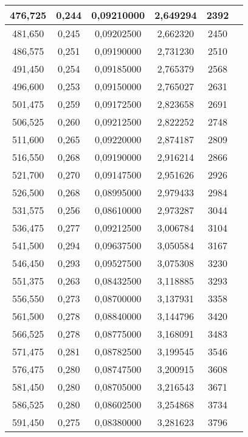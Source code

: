 \documentclass[a4paper,12pt]{article}
\numberwithin{equation}{section}
\begin{document}
\begin{appendices}
\begin{longtable}[c]{|c|c|c|c|c|c|}
476,725	&	 		0,244	&	 		0,09210000		 	&	2,649294	&	 		2392		\\\hline
481,650	&	 		0,245	&	 		0,09202500		 	&	2,662320	&	 		2450		\\\hline
486,575	&	 		0,251	&	 		0,09190000		 	&	2,731230	&	 		2510		\\\hline
491,450	&	 		0,254	&	 		0,09185000		 	&	2,765379	&	 		2568		\\\hline
496,600	&	 		0,253	&	 		0,09150000		 	&	2,765027	&	 		2631		\\\hline
501,475	&	 		0,259	&	 		0,09172500		 	&	2,823658	&	 		2691		\\\hline
506,525	&	 		0,260	&	 		0,09212500		 	&	2,822252	&	 		2748		\\\hline
511,600	&	 		0,265	&	 		0,09220000		 	&	2,874187	&	 		2809		\\\hline
516,550	&	 		0,268	&	 		0,09190000		 	&	2,916214	&	 		2866		\\\hline
521,700	&	 		0,270	&	 		0,09147500		 	&	2,951626	&	 		2926		\\\hline
526,500	&	 		0,268	&	 		0,08995000		 	&	2,979433	&	 		2984		\\\hline
531,575	&	 		0,256	&	 		0,08610000		 	&	2,973287	&	 		3044		\\\hline
536,475	&	 		0,277	&	 		0,09212500		 	&	3,006784	&	 		3104		\\\hline
541,500	&	 		0,294	&	 		0,09637500		 	&	3,050584	&	 		3167		\\\hline
546,450	&	 		0,293	&	 		0,09527500		 	&	3,075308	&	 		3230		\\\hline
551,375	&	 		0,263	&	 		0,08432500		 	&	3,118885	&	 		3293		\\\hline
556,550	&	 		0,273	&	 		0,08700000		 	&	3,137931	&	 		3358		\\\hline
561,500	&	 		0,278	&	 		0,08840000		 	&	3,144796	&	 		3420		\\\hline
566,525	&	 		0,278	&	 		0,08775000		 	&	3,168091	&	 		3483		\\\hline
571,475	&	 		0,281	&	 		0,08782500		 	&	3,199545	&	 		3546		\\\hline
576,475	&	 		0,280	&	 		0,08747500		 	&	3,200915	&	 		3608		\\\hline
581,450	&	 		0,280	&	 		0,08705000		 	&	3,216543	&	 		3671		\\\hline
586,525	&	 		0,280	&	 		0,08602500		 	&	3,254868	&	 		3734		\\\hline
591,450	&	 		0,275	&	 		0,08380000		 	&	3,281623	&	 		3796		\\\hline

\end{longtable}
\end{appendices}
\end{document}
